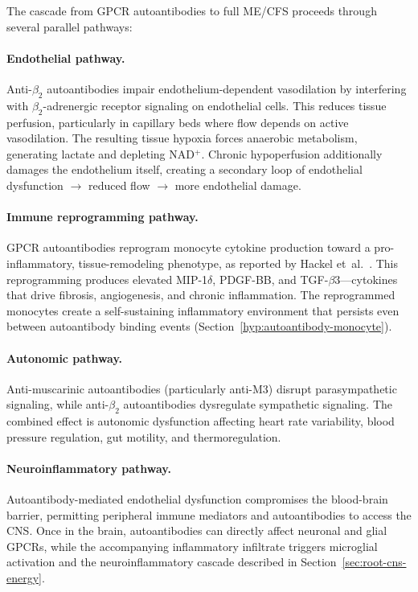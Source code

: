 The cascade from GPCR autoantibodies to full ME/CFS proceeds through several parallel pathways:

\paragraph{Endothelial pathway.} Anti-$\beta_2$ autoantibodies impair endothelium-dependent vasodilation by interfering with $\beta_2$-adrenergic receptor signaling on endothelial cells. This reduces tissue perfusion, particularly in capillary beds where flow depends on active vasodilation. The resulting tissue hypoxia forces anaerobic metabolism, generating lactate and depleting NAD$^+$. Chronic hypoperfusion additionally damages the endothelium itself, creating a secondary loop of endothelial dysfunction $\rightarrow$ reduced flow $\rightarrow$ more endothelial damage.

\paragraph{Immune reprogramming pathway.} GPCR autoantibodies reprogram monocyte cytokine production toward a pro-inflammatory, tissue-remodeling phenotype, as reported by Hackel et~al.~\cite{Hackel2025monocyte}. This reprogramming produces elevated MIP-1$\delta$, PDGF-BB, and TGF-$\beta$3---cytokines that drive fibrosis, angiogenesis, and chronic inflammation. The reprogrammed monocytes create a self-sustaining inflammatory environment that persists even between autoantibody binding events (Section~\ref{hyp:autoantibody-monocyte}).

\paragraph{Autonomic pathway.} Anti-muscarinic autoantibodies (particularly anti-M3) disrupt parasympathetic signaling, while anti-$\beta_2$ autoantibodies dysregulate sympathetic signaling. The combined effect is autonomic dysfunction affecting heart rate variability, blood pressure regulation, gut motility, and thermoregulation.

\paragraph{Neuroinflammatory pathway.} Autoantibody-mediated endothelial dysfunction compromises the blood-brain barrier, permitting peripheral immune mediators and autoantibodies to access the CNS. Once in the brain, autoantibodies can directly affect neuronal and glial GPCRs, while the accompanying inflammatory infiltrate triggers microglial activation and the neuroinflammatory cascade described in Section~\ref{sec:root-cns-energy}.

